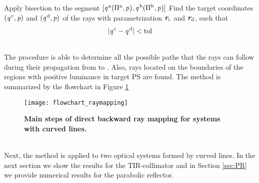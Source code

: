 \begin{algorithm}
\begin{algorithmic}[1]
\EndIf
\Else 
\State Apply bisection to the segment $[\textit{q}^{\,\textrm{a}}(\Pi^\textrm{a}, \textit{p}_{\textrm{} \textit{}}), \textit{q}^{\,\textrm{b}}(\Pi^\textrm{b}, \textit{p}_{\textrm{} \textit{}})]$
\State Find the target coordinates $(\textit{q}^{\,\textrm{c}},\textit{p})$ and $(\textit{q}^{\,\textrm{d}},\textit{p})$ of the rays with parame\-trization $\textit{\textbf{r}}_{\textrm{c}}$ and $\textit{\textbf{r}}_{\textrm{d}}$, such that $$|\textit{q}^{\,\textrm{c}}-\textit{q}^{\,\textrm{d}}|<\textrm{tol}$$
\If {$\lineaj\neq \nline$}
\State{}
\EndIf 
\State{}
\EndIf
\EndProcedure
\end{algorithmic}
\end{algorithm}
\\ \indent The procedure is able to determine all the possible paths that the rays can follow during their propagation from  to . Also, rays located on the boundaries of the regions with positive luminance in target PS  are found.
The method is summarized by the flowchart in Figure \ref{fig:flowchart_raymapping}
\begin{figure}[t]
  \begin{center}
  \texttt{[image: flowchart\_raymapping]}
  \end{center}
  \caption{\textbf{Main steps of direct backward ray mapping for systems with curved lines.}}
\label{fig:flowchart_raymapping}
 \end{figure}
\\ \indent
Next, the method is applied to two optical systems formed by curved lines. In the next section we show the results for the TIR-collimator and in Section \ref{sec:PR} we provide numerical results for the parabolic reflector.
